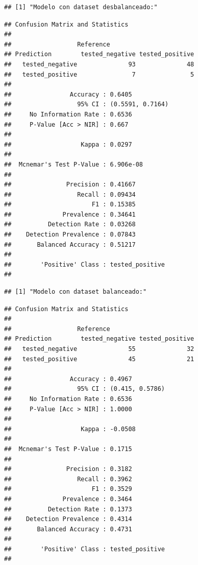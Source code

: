 \documentclass[
]{article}
\begin{document}
\begin{verbatim}
## [1] "Modelo con dataset desbalanceado:"
\end{verbatim}

\begin{verbatim}
## Confusion Matrix and Statistics
## 
##                  Reference
## Prediction        tested_negative tested_positive
##   tested_negative              93              48
##   tested_positive               7               5
##                                           
##                Accuracy : 0.6405          
##                  95% CI : (0.5591, 0.7164)
##     No Information Rate : 0.6536          
##     P-Value [Acc > NIR] : 0.667           
##                                           
##                   Kappa : 0.0297          
##                                           
##  Mcnemar's Test P-Value : 6.906e-08       
##                                           
##               Precision : 0.41667         
##                  Recall : 0.09434         
##                      F1 : 0.15385         
##              Prevalence : 0.34641         
##          Detection Rate : 0.03268         
##    Detection Prevalence : 0.07843         
##       Balanced Accuracy : 0.51217         
##                                           
##        'Positive' Class : tested_positive 
## 
\end{verbatim}

\begin{verbatim}
## [1] "Modelo con dataset balanceado:"
\end{verbatim}

\begin{verbatim}
## Confusion Matrix and Statistics
## 
##                  Reference
## Prediction        tested_negative tested_positive
##   tested_negative              55              32
##   tested_positive              45              21
##                                          
##                Accuracy : 0.4967         
##                  95% CI : (0.415, 0.5786)
##     No Information Rate : 0.6536         
##     P-Value [Acc > NIR] : 1.0000         
##                                          
##                   Kappa : -0.0508        
##                                          
##  Mcnemar's Test P-Value : 0.1715         
##                                          
##               Precision : 0.3182         
##                  Recall : 0.3962         
##                      F1 : 0.3529         
##              Prevalence : 0.3464         
##          Detection Rate : 0.1373         
##    Detection Prevalence : 0.4314         
##       Balanced Accuracy : 0.4731         
##                                          
##        'Positive' Class : tested_positive
## 
\end{verbatim}
\end{document}
